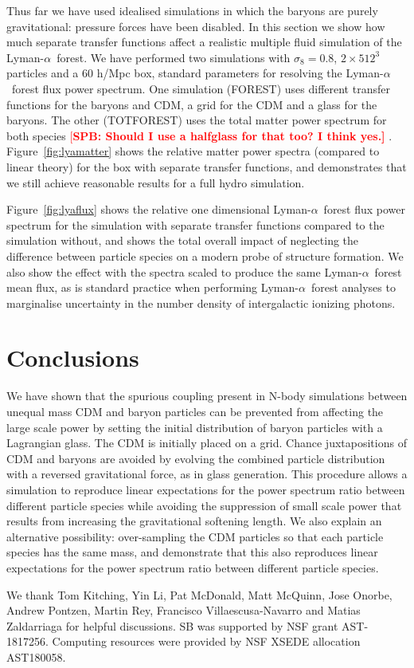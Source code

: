 \documentclass[a4paper,11pt]{article}
\newcommand{\Lya}{Lyman-$\alpha$}
\newcommand{\spb}[1]{\textcolor{red}{[\bf SPB: #1]} }
\begin{document}
Thus far we have used idealised simulations in which the baryons are purely gravitational: pressure forces have been disabled. In this section we show how much separate transfer functions affect a realistic multiple fluid simulation of the \Lya~forest. We have performed two simulations with $\sigma_8 = 0.8$, $2\times 512^3$ particles and a $60$ h/Mpc box, standard parameters for resolving the \Lya~forest flux power spectrum. One simulation (FOREST) uses different transfer functions for the baryons and CDM, a grid for the CDM and a glass for the baryons. The other (TOTFOREST) uses the total matter power spectrum for both species \spb{Should I use a halfglass for that too? I think yes.}. Figure~\ref{fig:lyamatter} shows the relative matter power spectra (compared to linear theory) for the box with separate transfer functions, and demonstrates that we still achieve reasonable results for a full hydro simulation.

Figure~\ref{fig:lyaflux} shows the relative one dimensional \Lya~forest flux power spectrum for the simulation with separate transfer functions compared to the simulation without, and shows the total overall impact of neglecting the difference between particle species on a modern probe of structure formation. We also show the effect with the spectra scaled to produce the same \Lya~forest mean flux, as is standard practice when performing \Lya~forest analyses to marginalise uncertainty in the number density of intergalactic ionizing photons.

\section{Conclusions}

We have shown that the spurious coupling present in N-body simulations between unequal mass CDM and baryon particles can be prevented from affecting the large scale power by setting the initial distribution of baryon particles with a Lagrangian glass. The CDM is initially placed on a grid. Chance juxtapositions of CDM and baryons are avoided by evolving the combined particle distribution with a reversed gravitational force, as in glass generation. This procedure allows a simulation to reproduce linear expectations for the power spectrum ratio between different particle species while avoiding the suppression of small scale power that results from increasing the gravitational softening length. We also explain an alternative possibility: over-sampling the CDM particles so that each particle species has the same mass, and demonstrate that this also reproduces linear expectations for the power spectrum ratio between different particle species.

\acknowledgments

We thank Tom Kitching, Yin Li, Pat McDonald, Matt McQuinn, Jose Onorbe, Andrew Pontzen, Martin Rey, Francisco Villaescusa-Navarro and Matias Zaldarriaga for helpful discussions. SB was supported by NSF grant AST-1817256. Computing resources were provided by NSF XSEDE allocation AST180058.



\end{document}
